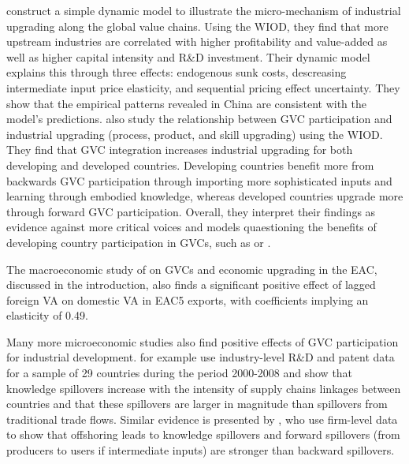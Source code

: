 \documentclass[a4paper]{article}
\begin{document}
\citet{shen2021towards} construct a simple dynamic model to illustrate the micro-mechanism of industrial upgrading along the global value chains. Using the WIOD, they find that more upstream industries are correlated with higher profitability and value-added as well as higher capital intensity and R\&D investment. Their dynamic model explains this through three effects: endogenous sunk costs, descreasing intermediate input price elasticity, and sequential pricing effect uncertainty. They show that the empirical patterns revealed in China are consistent with the model's predictions. \citet{tian2022global} also study the relationship between GVC participation and industrial upgrading (process, product, and skill upgrading) using the WIOD. They find that GVC integration increases industrial upgrading for both developing and developed countries. Developing countries benefit more from backwards GVC participation through importing more sophisticated inputs and learning through embodied knowledge, whereas developed countries upgrade more through forward GVC participation. Overall, they interpret their findings as evidence against more critical voices and models quaestioning the benefits of developing country participation in GVCs, such as \citet{baldwin2014trade} or \citet{dalle2013industrial}. \newline

The macroeconomic study of \citet{lwesya2022integration} on GVCs and economic upgrading in the EAC, discussed in the introduction, also finds a significant positive effect of lagged foreign VA on domestic VA in EAC5 exports, with coefficients implying an elasticity of 0.49. \newline 

Many more microeconomic studies also find positive effects of GVC participation for industrial development. \citet{piermartini2014knowledge} for example use industry-level R\&D and patent data for a sample of 29 countries during the period 2000-2008 and show that knowledge spillovers increase with the intensity of supply chains linkages between countries and that these spillovers are larger in magnitude than spillovers from traditional trade flows. Similar evidence is presented by \citet{benz2015trade}, who use firm-level data to show that offshoring leads to knowledge spillovers and forward spillovers (from producers to users if intermediate inputs) are stronger than backward spillovers. \newline %
\end{document}
